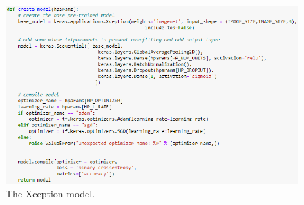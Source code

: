 \begin{figure}[H]
    \centering
    \includegraphics[width=\textwidth]{figures/xception-model.png}
    \caption{The Xception model.}
    \label{fig:xception-model}
\end{figure}